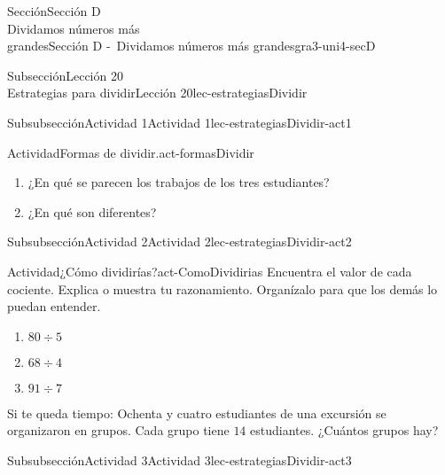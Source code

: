 \begin{sectionptx}{Sección}{{\Large Sección D\\}Dividamos números más\\grandes}{}{Sección D -~Dividamos números más grandes}{}{}{gra3-uni4-secD}
\begin{subsectionptx}{Subsección}{{\normalsize Lección 20\\[-0.05cm]}Estrategias para dividir}{}{Lección 20}{}{}{lec-estrategiasDividir}
\begin{subsubsectionptx}{Subsubsección}{Actividad 1}{}{Actividad 1}{}{}{lec-estrategiasDividir-act1}
\begin{activity}{Actividad}{Formas de dividir.}{act-formasDividir}
\begin{enumerate}
\begin{image}{0}{1}{0}{}
\end{image}%
%
\begin{sidebyside}{2}{0}{0}{0}%
\begin{sbspanel}{0.5}%
Priya%
\par
\(3\times 10 = 30\)\\
 \(3\times 10 = 30\)\\
 \(3\times \phantom{0}6 = 18\)\\
 \(\overline {3 \times 26 =78}\)%
\end{sbspanel}%
\begin{sbspanel}{0.5}%
Tyler%
\par
\(3\times 20 = 60\)\\
 \(3\times \phantom{0}6 = 18\)\\
 \(20 + 6 = 26\)%
\end{sbspanel}%
\end{sidebyside}%
\item{}¿En qué se parecen los trabajos de los tres estudiantes?%
\item{}¿En qué son diferentes?%
\end{enumerate}
\end{activity}%
\end{subsubsectionptx}
%
%
\typeout{************************************************}
\typeout{************************************************}
%
\begin{subsubsectionptx}{Subsubsección}{Actividad 2}{}{Actividad 2}{}{}{lec-estrategiasDividir-act2}
\begin{activity}{Actividad}{¿Cómo dividirías?}{act-ComoDividirias}%
Encuentra el valor de cada cociente. Explica o muestra tu razonamiento. Organízalo para que los demás lo puedan entender.%
%
\begin{enumerate}
\item{}\(\displaystyle 80\div 5\)%
\item{}\(\displaystyle 68\div 4\)%
\item{}\(\displaystyle 91\div 7\)%
\end{enumerate}
Si te queda tiempo: Ochenta y cuatro estudiantes de una excursión se organizaron en grupos. Cada grupo tiene \(14\) estudiantes. ¿Cuántos grupos hay?%
\end{activity}%
\end{subsubsectionptx}
%
%
\typeout{************************************************}
\typeout{************************************************}
%
\begin{subsubsectionptx}{Subsubsección}{Actividad 3}{}{Actividad 3}{}{}{lec-estrategiasDividir-act3}

\end{subsubsectionptx}
\end{subsectionptx}
\end{sectionptx}
